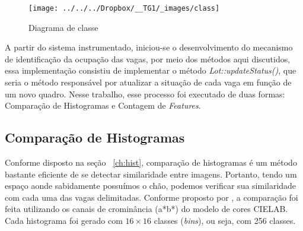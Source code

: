 \documentclass[ecp,tc]{iiufrgs}
\begin{document}
\begin{figure}
	\centering
	\caption{Diagrama de classe}
	\texttt{[image: ../../../Dropbox/\_\_TG1/\_images/class]}
	\label{fig:class}
\end{figure}

A partir do sistema instrumentado, iniciou-se o desenvolvimento do mecanismo de identificação da ocupação das vagas, por meio dos métodos aqui discutidos, essa implementação consistiu de implementar o método \textit{Lot::updateStatus()}, que seria o método responsável por atualizar a situação de cada vaga em função de um novo quadro. Nesse trabalho, esse processo foi executado de duas formas: Comparação de Histogramas e Contagem de \textit{Features}.

\subsection{Comparação de Histogramas}

Conforme disposto na seção ~\ref{ch:hist}, comparação de histogramas é um método bastante eficiente de se detectar similaridade entre imagens. Portanto, tendo um espaço aonde sabidamente possuímos o chão, podemos verificar sua similaridade com cada uma das vagas delimitadas. Conforme proposto por , a comparação foi feita utilizando os canais de crominância (a*b*) do modelo de cores CIELAB. Cada histograma foi gerado com $ 16 \times 16 $ classes (\textit{bins}), ou seja, com 256 classes.
\end{document}
